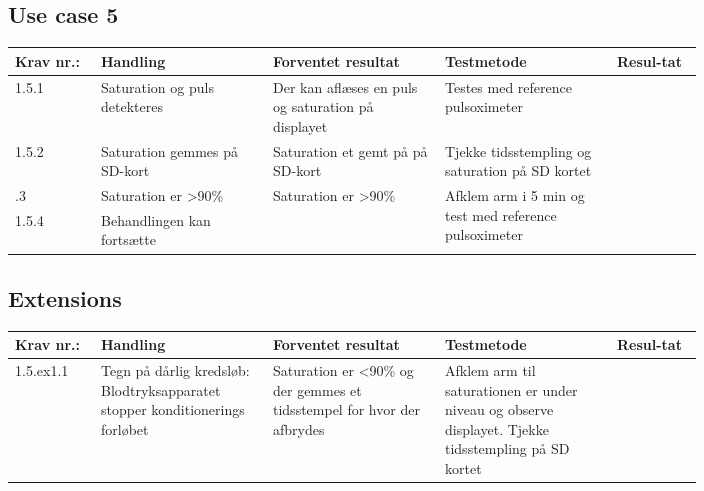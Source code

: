 \documentclass[12pt, a4paper]{memoir}
\begin{document}
\begin{landscape}
				\subsection{Use case 5}
					\begin{longtable}{|p{0.1\linewidth}|p{0.2\linewidth}|p{0.2\linewidth}|p{0.2\linewidth}|p{0.1\linewidth}|}
							\hline
							Krav nr.: & Handling & Forventet resultat & Testmetode & Resul-tat  \\\hline
							1.5.1 & Saturation og puls detekteres & Der kan aflæses en puls og saturation på displayet& Testes med reference pulsoximeter & \\ \hline
							1.5.2 & Saturation gemmes på SD-kort & Saturation et gemt på på SD-kort & Tjekke tidsstempling og saturation på SD kortet & \\ \hline
							\pagebreak \hline
							1.5.3 & Saturation er \textgreater90\%  & \multirow{2}{\linewidth}{Saturation er \textgreater90\% } & \multirow{2}{\linewidth}{Afklem arm i 5 min og test med reference pulsoximeter} & \multirow{2}{\linewidth}{}  \\ \cline{1-2}
							1.5.4 & Behandlingen kan fortsætte & & & \\ \hline
					\end{longtable}
					
				\subsection*{Extensions}
					\begin{longtable}{|p{0.1\linewidth}|p{0.2\linewidth}|p{0.2\linewidth}|p{0.2\linewidth}|p{0.1\linewidth}|}
							\hline
							Krav nr.: & Handling & Forventet resultat & Testmetode & Resul-tat  \\\hline
							1.5.ex1.1 & Tegn på dårlig kredsløb: Blodtryksapparatet stopper konditionerings forløbet & Saturation er \textless90\% og der gemmes et tidsstempel for hvor der afbrydes & Afklem arm til saturationen er  under niveau og observe displayet.
							Tjekke tidsstempling på SD kortet & \\ \hline
					\end{longtable}
				

\end{landscape}
\end{document}
